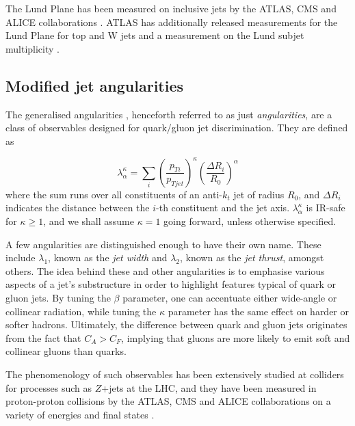 \documentclass[10pt,a4paper]{book}
\begin{document}
The Lund Plane has been measured on inclusive jets by the ATLAS, CMS and ALICE collaborations \cite{ATLAS:2020bbn, CMS:2023lpp, ALICE:2021yet}. ATLAS has additionally released measurements for the Lund Plane for top and W jets \cite{ATLAS:2024dua} and a measurement on the Lund subjet multiplicity \cite{ATLAS:2024wrd}.


 
\subsection{Modified jet angularities}
\label{angles}

The generalised angularities \cite{Larkoski:2014pca, Proceedings:2018jsb, Gras:2017jty}, henceforth referred to as just \emph{angularities}, are a class of observables designed for quark/gluon jet discrimination. They are defined as 

\begin{equation}
\lambda^\kappa_\alpha = \sum_i \left(\frac{p_{Ti}}{p_{Tjet}}\right)^\kappa \left(\frac{\Delta R_i}{R_0} \right)^\alpha
\end{equation} 
where the sum runs over all constituents of an anti-$k_t$ jet of radius $R_0$, and $\Delta R_i$ indicates the distance between the $i$-th constituent and the jet axis. $\lambda^\kappa_\alpha$ is IR-safe for $\kappa \geq 1$, and we shall assume $\kappa = 1$ going forward, unless otherwise specified.

A few angularities are distinguished enough to have their own name. These include $\lambda_1$, known as the \emph{jet width} and $\lambda_2$, known as the \emph{jet thrust}, amongst others. The idea behind these and other angularities is to emphasise various aspects of a jet's substructure in order to highlight features typical of quark or gluon jets. By tuning the $\beta$ parameter, one can accentuate either wide-angle or collinear radiation, while tuning the $\kappa$ parameter has the same effect on harder or softer hadrons. Ultimately, the difference between quark and gluon jets originates from the fact that $C_A > C_F$, implying that gluons are more likely to emit soft and collinear gluons than quarks.

The phenomenology of such observables has been extensively studied at colliders for processes such as $Z$+jets \cite{Reichelt:2021svh} at the LHC, and they have been measured in proton-proton collisions by the ATLAS, CMS and ALICE collaborations on a variety of energies and final states \cite{ATLAS:2019kwg, CMS:2021vsp, ALICE:2021njq, Dhankher:2024rkv}.
\end{document}
